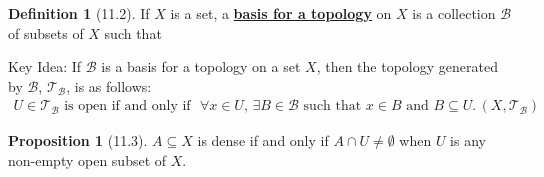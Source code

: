 \documentclass{article}
\newcommand{\B}{\ensuremath{\mathcal{B}}}
\newcommand{\Iff}{if and only if}
\newcommand{\define}[1]{\textbf{\underline{#1}}}
\newcommand{\tp}{\ensuremath{\mathcal{T}}}
\newcommand{\Ts}[2]{\ensuremath{(#1,#2)}}
\newcommand{\inter}{\cap}
\renewcommand{\Subset}{\subseteq}
\theoremstyle{definition}
\newtheorem*{defn}{Definition}
\newtheorem*{prop}{Proposition}
\theoremstyle{remark}
\begin{document}
            \begin{defn}[11.2]
                If $X$ is a set, a \define{basis for a topology} on $X$ is a collection $\B$ of subsets of $X$ such that
            \end{defn}
            
            Key Idea: If $\B$ is a basis for a topology on a set $X$, then the topology generated by $\B$, $\tp_\B$, is as follows:
            \begin{align*}
                U \in \tp_\B \text{ is open \Iff{} } \forall x \in U, \, \exists B \in \B \text{ such that } x \in B \text{ and } B \Subset U.\, \Ts{X}{\tp_\B}
            \end{align*}

            \begin{prop}[11.3]
                $A \Subset X$ is dense \Iff{} $A \inter U \neq \emptyset$ when $U$ is any non-empty open subset of $X$.
            \end{prop}
\end{document}
